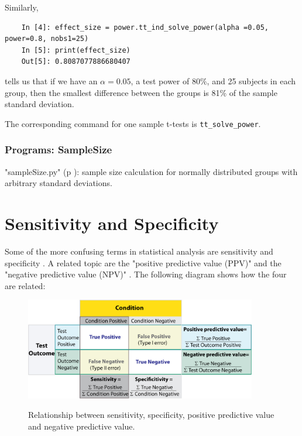 Similarly,

\begin{lstlisting}
    In [4]: effect_size = power.tt_ind_solve_power(alpha =0.05, power=0.8, nobs1=25)
    In [5]: print(effect_size)
    Out[5]: 0.8087077886680407
\end{lstlisting}

tells us that if we have an $\alpha=0.05$, a test power of $80\%$, and 25 subjects in each group, then the smallest difference between the groups is 81\% of the sample standard deviation.

The corresponding command for one sample t-tests is \lstinline{tt_solve_power}.

\subsubsection{Programs: SampleSize}

\PyImg "sampleSize.py" (p \pageref{py:sampleSize}): sample size calculation for normally distributed groups with arbitrary standard deviations.


\section{Sensitivity and Specificity}

Some of the more confusing terms in statistical analysis are \gls{sensitivity}  and \gls{specificity} . A related topic are the "positive predictive value (PPV)"  and the "negative predictive value (NPV)" . The following diagram shows how the four are related:

\begin{figure}[ht]
  \centering
  \includegraphics[width=0.9\textwidth]{../Images/Sensitivity_Specificity_Diagram.jpg}\\
  \caption{Relationship between sensitivity, specificity, positive predictive value and negative predictive value.}\label{fig:sens_spec_diagram}
\end{figure}


